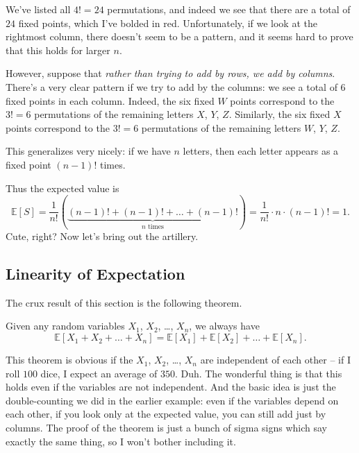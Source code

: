 \documentclass[11pt]{scrartcl}
\newcommand\EE{\mathbb E}
\begin{document}
We've listed all $4! = 24$ permutations, and indeed we see that
there are a total of $24$ fixed points, which I've bolded in red.
Unfortunately, if we look at the rightmost column, there doesn't seem to
be a pattern, and it seems hard to prove that this holds for larger $n$.

However, suppose that
\emph{rather than trying to add by rows, we add by columns}.
There's a very clear pattern if we try to add by the columns:
we see a total of $6$ fixed points in each column.
Indeed, the six fixed $W$ points correspond to the $3!=6$ permutations
of the remaining letters $X$, $Y$, $Z$.
Similarly, the six fixed $X$ points correspond to the $3!=6$ permutations
of the remaining letters $W$, $Y$, $Z$.

This generalizes very nicely: if we have $n$ letters,
then each letter appears as a fixed point $(n-1)!$ times.

Thus the expected value is
\[ \EE[S] = 
	\frac{1}{n!}
	\left( \underbrace{(n-1)! + (n-1)! + \dots + (n-1)!}_{\text{$n$ times}} \right)
	= \frac{1}{n!} \cdot n \cdot (n-1)! = 1. \]
Cute, right? Now let's bring out the artillery.

\subsection{Linearity of Expectation}
The crux result of this section is the following theorem.
\begin{theorem}
	Given any random variables $X_1$, $X_2$, \dots, $X_n$, we always have
	\[ \EE[X_1 + X_2 + \dots + X_n]
		= \EE[X_1]
		+ \EE[X_2]
		+ \dots
		+ \EE[X_n].
	\]
\end{theorem}
This theorem is obvious if the $X_1$, $X_2$, \dots, $X_n$ are independent of each other
-- if I roll $100$ dice, I expect an average of $350$. Duh.
The wonderful thing is that this holds even if the variables are not independent.
And the basic idea is just the double-counting we did in the earlier example: even if the variables
depend on each other, if you look only at the expected value, you can still add just by columns.
The proof of the theorem is just a bunch of sigma signs which say exactly the same thing, so
I won't bother including it.
\end{document}
